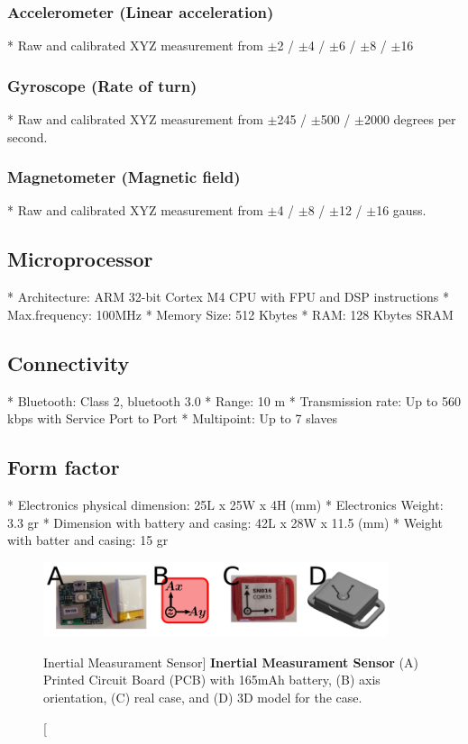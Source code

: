\subsubsection*{Accelerometer (Linear acceleration)}
* Raw and calibrated XYZ measurement from 
$\pm$2 / $\pm$4 / $\pm$6 / $\pm$8  / $\pm$16

\subsubsection*{Gyroscope (Rate of turn)}
* Raw and calibrated XYZ measurement from 
$\pm$245 /  $\pm$500 / $\pm$2000 degrees per second.

\subsubsection*{Magnetometer (Magnetic field)}
* Raw and calibrated XYZ measurement from 
$\pm$4 / $\pm$8 / $\pm$12 / $\pm$16 gauss.


\subsection*{Microprocessor}
* Architecture: ARM 32-bit Cortex M4 CPU with FPU and DSP instructions
* Max.frequency: 100MHz
* Memory Size: 512 Kbytes
* RAM: 128 Kbytes SRAM


\subsection*{Connectivity}
* Bluetooth: Class 2, bluetooth 3.0
* Range: 10 m
* Transmission rate: Up to 560 kbps with Service Port to Port
* Multipoint: Up to 7 slaves


\subsection*{Form factor}
* Electronics physical dimension: 25L x 25W x 4H (mm)
* Electronics Weight: 3.3 gr
* Dimension with battery and casing: 42L x 28W x 11.5 (mm)
* Weight with batter and casing: 15 gr


\begin{figure}
 \centering
   \includegraphics[width=0.9\textwidth]{muse}
   \caption
	[Inertial Measurament Sensor]{
	{\bf Inertial Measurament Sensor}
		(A) Printed Circuit Board (PCB) with 165mAh battery,
		(B) axis orientation, 
		(C) real case, and 
		(D) 3D model for the case.
}
   \label{fig:muse}
\end{figure}

